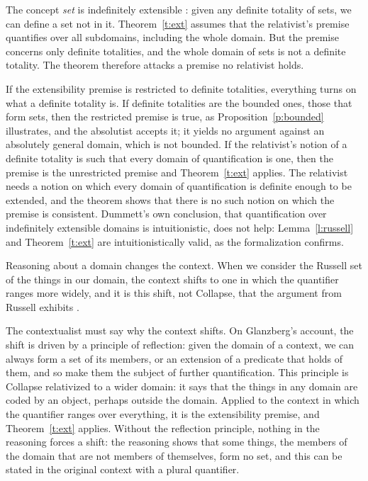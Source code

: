 \documentclass{situationist-preprint}
\begin{document}
\begin{objection}
The concept \emph{set} is indefinitely extensible \citep{Dummett1991}: given any definite totality of sets, we can define a set not in it. Theorem~\ref{t:ext} assumes that the relativist's premise quantifies over all subdomains, including the whole domain. But the premise concerns only definite totalities, and the whole domain of sets is not a definite totality. The theorem therefore attacks a premise no relativist holds.
\end{objection}

\begin{reply}
If the extensibility premise is restricted to definite totalities, everything turns on what a definite totality is. If definite totalities are the bounded ones, those that form sets, then the restricted premise is true, as Proposition~\ref{p:bounded} illustrates, and the absolutist accepts it; it yields no argument against an absolutely general domain, which is not bounded. If the relativist's notion of a definite totality is such that every domain of quantification is one, then the premise is the unrestricted premise and Theorem~\ref{t:ext} applies. The relativist needs a notion on which every domain of quantification is definite enough to be extended, and the theorem shows that there is no such notion on which the premise is consistent. Dummett's own conclusion, that quantification over indefinitely extensible domains is intuitionistic, does not help: Lemma~\ref{l:russell} and Theorem~\ref{t:ext} are intuitionistically valid, as the formalization confirms.
\end{reply}

\begin{objection}[Contextualism]
Reasoning about a domain changes the context. When we consider the Russell set of the things in our domain, the context shifts to one in which the quantifier ranges more widely, and it is this shift, not Collapse, that the argument from Russell exhibits \citep{Parsons1974,Glanzberg2004}.
\end{objection}

\begin{reply}
The contextualist must say why the context shifts. On Glanzberg's account, the shift is driven by a principle of reflection: given the domain of a context, we can always form a set of its members, or an extension of a predicate that holds of them, and so make them the subject of further quantification. This principle is Collapse relativized to a wider domain: it says that the things in any domain are coded by an object, perhaps outside the domain. Applied to the context in which the quantifier ranges over everything, it is the extensibility premise, and Theorem~\ref{t:ext} applies. Without the reflection principle, nothing in the reasoning forces a shift: the reasoning shows that some things, the members of the domain that are not members of themselves, form no set, and this can be stated in the original context with a plural quantifier.
\end{reply}
\end{document}
